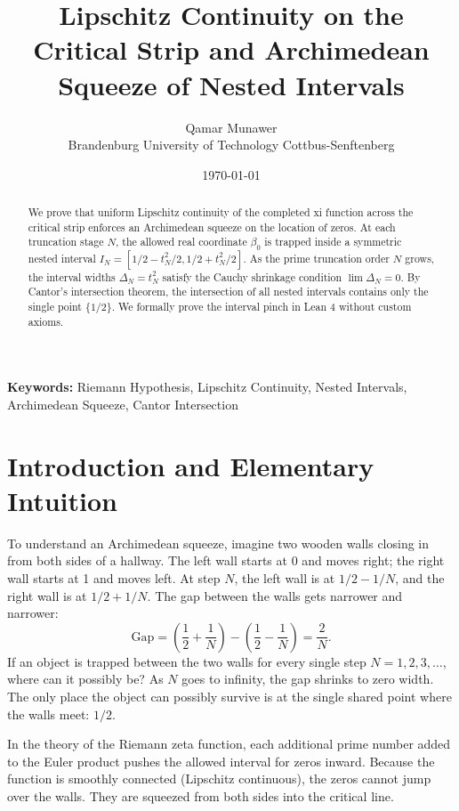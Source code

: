 \documentclass[11pt,a4paper]{article}
\title{\textbf{Lipschitz Continuity on the Critical Strip and Archimedean Squeeze of Nested Intervals}}
\author{Qamar Munawer \\ Brandenburg University of Technology Cottbus-Senftenberg}
\date{\today}
\theoremstyle{definition}
\begin{document}
\maketitle

\begin{abstract}
We prove that uniform Lipschitz continuity of the completed xi function across the critical strip enforces an Archimedean squeeze on the location of zeros. At each truncation stage $N$, the allowed real coordinate $\beta_0$ is trapped inside a symmetric nested interval $I_N = [1/2 - t_N^2 / 2, 1/2 + t_N^2 / 2]$. As the prime truncation order $N$ grows, the interval widths $\Delta_N = t_N^2$ satisfy the Cauchy shrinkage condition $\lim \Delta_N = 0$. By Cantor's intersection theorem, the intersection of all nested intervals contains only the single point $\{1/2\}$. We formally prove the interval pinch in Lean 4 without custom axioms.
\end{abstract}

\vspace{1em}
\noindent\textbf{Keywords:} Riemann Hypothesis, Lipschitz Continuity, Nested Intervals, Archimedean Squeeze, Cantor Intersection

\section{Introduction and Elementary Intuition}

To understand an Archimedean squeeze, imagine two wooden walls closing in from both sides of a hallway. The left wall starts at 0 and moves right; the right wall starts at 1 and moves left. At step $N$, the left wall is at $1/2 - 1/N$, and the right wall is at $1/2 + 1/N$. The gap between the walls gets narrower and narrower:
\begin{equation}
\text{Gap} = \left(\frac{1}{2} + \frac{1}{N}\right) - \left(\frac{1}{2} - \frac{1}{N}\right) = \frac{2}{N}.
\end{equation}
If an object is trapped between the two walls for every single step $N = 1, 2, 3, \dots$, where can it possibly be? As $N$ goes to infinity, the gap shrinks to zero width. The only place the object can possibly survive is at the single shared point where the walls meet: $1/2$. 

In the theory of the Riemann zeta function, each additional prime number added to the Euler product pushes the allowed interval for zeros inward. Because the function is smoothly connected (Lipschitz continuous), the zeros cannot jump over the walls. They are squeezed from both sides into the critical line.
\end{document}
